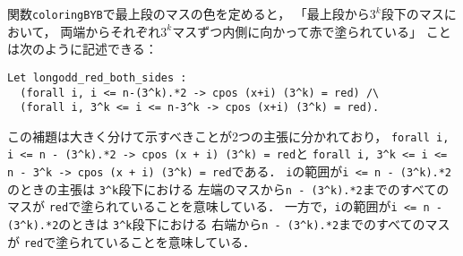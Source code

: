 関数{\tt{coloringBYB}}で最上段のマスの色を定めると，
「最上段から$3^k$段下のマスにおいて，
  両端からそれぞれ$3^k$マスずつ内側に向かって赤で塗られている」
ことは次のように記述できる：
\begin{lstlisting}[language=Coq]
  Let longodd_red_both_sides :
  (forall i, i <= n-(3^k).*2 -> cpos (x+i) (3^k) = red) /\
  (forall i, 3^k <= i <= n-3^k -> cpos (x+i) (3^k) = red).
\end{lstlisting}
この補題は大きく分けて示すべきことが2つの主張に分かれており，
{\tt{forall i, i <= n - (3\verb|^|k).*2 -> cpos (x + i) (3\verb|^|k) = red}}と
{\tt{forall i, 3\verb|^|k <= i <= n - 3\verb|^|k -> cpos (x + i) (3\verb|^|k) = red}}である．
{\tt{i}}の範囲が{\tt{i <= n - (3\verb|^|k).*2}}のときの主張は
{\tt{3\verb|^|k}}段下における
左端のマスから{\tt{n - (3\verb|^|k).*2}}までのすべてのマスが
{\tt{red}}で塗られていることを意味している．
一方で，{\tt{i}}の範囲が{\tt{i <= n - (3\verb|^|k).*2}}のときは
{\tt{3\verb|^|k}}段下における
右端から{\tt{n - (3\verb|^|k).*2}}までのすべてのマスが
{\tt{red}}で塗られていることを意味している．

